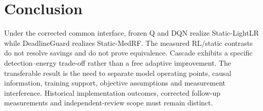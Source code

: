 \section{Conclusion}\label{sec:conclude}
Under the corrected common interface, frozen Q and DQN realize Static-LightLR while DeadlineGuard realizes Static-MedRF. The measured RL/static contrasts do not resolve savings and do not prove equivalence. Cascade exhibits a specific detection--energy trade-off rather than a free adaptive improvement. The transferable result is the need to separate model operating points, causal information, training support, objective assumptions and measurement interference. Historical implementation outcomes, corrected follow-up measurements and independent-review scope must remain distinct.
